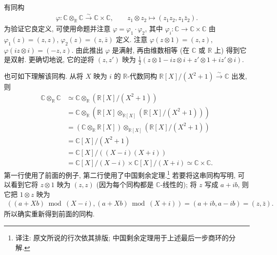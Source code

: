 \begin{example*}
有同构
\begin{align*}
\varphi:\mathbb C\otimes_{\mathbb R}\mathbb C\xrightarrow{\sim}\mathbb C\times\mathbb C,
\qquad z_1\otimes z_2\mapsto(z_1z_2,z_1\bar z_2).
\end{align*}
为验证它良定义, 可使用命题并注意 $\varphi=\varphi_1\cdot\varphi_2$, 其中 $\varphi_i:\mathbb C\longrightarrow\mathbb C\times\mathbb C$ 由 $\varphi_1(z)=(z,z)$, $\varphi_2(z)=(z,\bar z)$ 定义. 注意 $\varphi(z\otimes1)=(z,z)$, $\varphi(iz\otimes i)=(-z,z)$. 由此推出 $\varphi$ 是满射, 再由维数相等 (在 $\mathbb C$ 或 $\mathbb R$ 上) 得到它是双射. 更确切地说, 它的逆将 $(z,z')$ 映为 $\frac12(z\otimes1-iz\otimes i+z'\otimes1+iz'\otimes i)$.

也可如下理解该同构. 从将 $X$ 映为 $i$ 的 $\mathbb R$-代数同构 $\mathbb R[X]/(X^2+1)\xrightarrow{\sim}\mathbb C$ 出发, 则
\begin{align*}
\mathbb C\otimes_{\mathbb R}\mathbb C
&\simeq\mathbb C\otimes_{\mathbb R}(\mathbb R[X]/(X^2+1))\\
&=\mathbb C\otimes_{\mathbb R}(\mathbb R[X]\otimes_{\mathbb R[X]}(\mathbb R[X]/(X^2+1)))\\
&=(\mathbb C\otimes_{\mathbb R}\mathbb R[X])\otimes_{\mathbb R[X]}(\mathbb R[X]/(X^2+1))\\
&=\mathbb C[X]/(X^2+1)\\
&=\mathbb C[X]/((X-i)(X+i))\\
&=\mathbb C[X]/(X-i)\times\mathbb C[X]/(X+i)\simeq\mathbb C\times\mathbb C.
\end{align*}
第一行使用了前面的例子, 第二行使用了中国剩余定理.\footnote{译注: 原文所说的行次依其排版; 中国剩余定理用于上述最后一步商环的分解.} 若要将这串同构写明, 可以看到它将 $z\otimes1$ 映为 $(z,z)$ (因为每个同构都是 $\mathbb C$-线性的); 将 $z$ 写成 $a+ib$, 则它把 $1\otimes z$ 映为
\begin{align*}
((a+Xb)\bmod(X-i),(a+Xb)\bmod(X+i))=(a+ib,a-ib)=(z,\bar z).
\end{align*}
所以确实重新得到前面的同构.
\end{example*}
